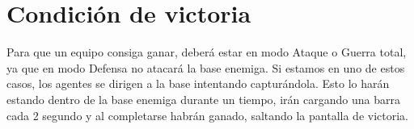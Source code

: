 \section{Condición de victoria} 
Para que un equipo consiga ganar, deberá estar en modo Ataque o Guerra total, ya que en modo Defensa no atacará la base enemiga. Si estamos en uno de estos casos, los agentes se dirigen a la base intentando capturándola. Esto lo harán estando dentro de la base enemiga durante un tiempo, irán cargando una barra cada 2 segundo y al completarse habrán ganado, saltando la pantalla de victoria.